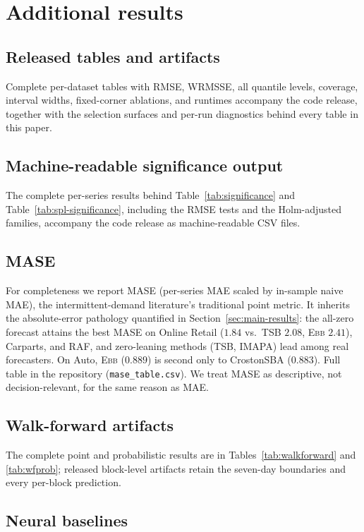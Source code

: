 \documentclass[twoside]{article}
\theoremstyle{definition}
\newcommand{\EBB}{\textsc{Ebb}}
\begin{document}
\section{Additional results}\label{app:extra}



\subsection{Released tables and artifacts}
Complete per-dataset tables with RMSE, WRMSSE, all quantile levels,
coverage, interval widths, fixed-corner ablations, and runtimes accompany
the code release, together with the selection surfaces and per-run
diagnostics behind every table in this paper.

\subsection{Machine-readable significance output}
The complete per-series results behind Table~\ref{tab:significance} and
Table~\ref{tab:spl-significance}, including the RMSE tests and the
Holm-adjusted families, accompany the code release as machine-readable
CSV files.

\subsection{MASE}
For completeness we report MASE (per-series MAE scaled by in-sample
naive MAE), the intermittent-demand literature's traditional point
metric. It inherits the absolute-error pathology quantified in
Section~\ref{sec:main-results}: the all-zero forecast attains the best
MASE on Online Retail ($1.84$ vs.\ TSB $2.08$, \EBB{} $2.41$),
Carparts, and RAF, and zero-leaning methods (TSB, IMAPA) lead among real
forecasters. On Auto, \EBB{} ($0.889$) is second only to CrostonSBA
($0.883$). Full table in the repository
(\texttt{mase\_table.csv}). We treat MASE as descriptive, not
decision-relevant, for the same reason as MAE.

\subsection{Walk-forward artifacts}
The complete point and probabilistic results are in
Tables~\ref{tab:walkforward} and \ref{tab:wfprob}; released block-level
artifacts retain the seven-day boundaries and every per-block prediction.

\subsection{Neural baselines}
\label{app:neural}
\end{document}
